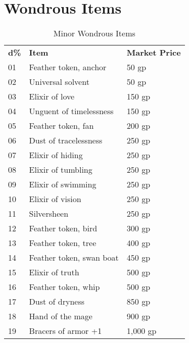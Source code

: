 \section{Wondrous Items}

\begin{table}[]
\sffamily
\caption{Minor Wondrous Items}
\begin{tabular}{lll}
\textbf{d\%} & \textbf{Item}                                        & \textbf{Market Price} \\
01  & Feather token, anchor                       & 50 gp        \\
02  & Universal solvent                           & 50 gp        \\
03  & Elixir of love                              & 150 gp       \\
04  & Unguent of timelessness                     & 150 gp       \\
05  & Feather token, fan                          & 200 gp       \\
06  & Dust of tracelessness                       & 250 gp       \\
07  & Elixir of hiding                            & 250 gp       \\
08  & Elixir of tumbling                          & 250 gp       \\
09  & Elixir of swimming                          & 250 gp       \\
10  & Elixir of vision                            & 250 gp       \\
11  & Silversheen                                 & 250 gp       \\
12  & Feather token, bird                         & 300 gp       \\
13  & Feather token, tree                         & 400 gp       \\
14  & Feather token, swan boat                    & 450 gp       \\
15  & Elixir of truth                             & 500 gp       \\
16  & Feather token, whip                         & 500 gp       \\
17  & Dust of dryness                             & 850 gp       \\
18  & Hand of the mage                            & 900 gp       \\
19  & Bracers of armor +1                         & 1,000 gp     \\

\end{tabular}
\end{table}
